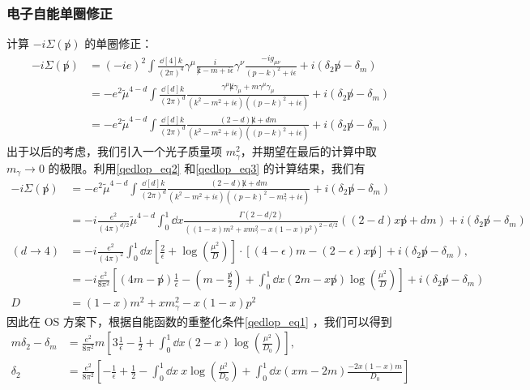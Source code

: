 \subsubsection{电子自能单圈修正}
计算 $-i\Sigma(\not p)$ 的单圈修正：
\begin{equation}
\begin{aligned}
-i\Sigma(\not p)
&=(-ie)^2 \int\frac{\dd[4]{k}}{(2\pi)^4} \gamma^\mu\frac{i}{\not k-m+i\epsilon} \gamma^\nu  \frac{-ig_{\mu\nu}}{(p-k)^2+i\epsilon}+i(\delta_2\not p -\delta_m)\\
&=-e^2\tilde{\mu}^{4-d} \int\frac{\dd[d]{k}}{(2\pi)^d} \frac{\gamma^\mu \not k \gamma_\mu + m\gamma^\mu\gamma_\mu}{(k^2-m^2+i\epsilon)((p-k)^2+i\epsilon)}+i(\delta_2\not p -\delta_m)
\\
&=-e^2\tilde{\mu}^{4-d} \int\frac{\dd[d]{k}}{(2\pi)^d} \frac{(2-d)\not k + dm}{(k^2-m^2+i\epsilon)((p-k)^2+i\epsilon)}+i(\delta_2\not p -\delta_m)
\end{aligned}
\end{equation}
出于以后的考虑，我们引入一个光子质量项 $m_\gamma^2$，并期望在最后的计算中取 $m_\gamma\rightarrow 0$ 的极限。利用\autoref{qedlop_eq2} 和\autoref{qedlop_eq3} 的计算结果，我们有
\begin{equation}
\begin{aligned}
-i\Sigma(\not p)
&=-e^2\tilde{\mu}^{4-d} \int\frac{\dd[d]{k}}{(2\pi)^d} \frac{(2-d)\not k + dm}{(k^2-m^2+i\epsilon)((p-k)^2-m_\gamma^2+i\epsilon)}+i(\delta_2\not p -\delta_m)
\\
&= -i\frac{e^2}{(4\pi)^{d/2}}\tilde{\mu}^{4-d}
\int_0^1 \dd x \frac{\Gamma(2-d/2)}{((1-x)m^2+x m_\gamma^2-x(1-x)p^2)^{2-d/2}}((2-d)x\not p+dm)
+i(\delta_2\not p -\delta_m)
\\
(d\rightarrow 4)&= -i\frac{e^2}{(4\pi)^2}  \int_0^1 \dd x \left[\frac{2}{\epsilon}+\log\left(\frac{\mu^2}{D}\right)\right]\cdot \left[(4-\epsilon)m -(2-\epsilon)x\not p\right]
+i(\delta_2\not p -\delta_m),\\
&=-i\frac{e^2}{8\pi^2}\left[(4m-\not p)\frac{1}{\epsilon}-\left(m-\frac{\not p}{2}\right)+ \int_0^1\dd x (2m-x\not p)\log\left(\frac{\mu^2}{D}\right) \right]
+i(\delta_2\not p -\delta_m)\\
D&=(1-x)m^2+xm_\gamma^2-x(1-x)p^2
\end{aligned}
\end{equation}
因此在 OS 方案下，根据自能函数的重整化条件\autoref{qedlop_eq1} ，我们可以得到
\begin{equation}
\begin{aligned}
m\delta_2 - \delta_m &= \frac{e^2}{8\pi^2}m\left[3\frac{1}{\epsilon}-\frac{1}{2}+ \int_0^1\dd{x} (2-x)\log\left(\frac{\mu^2}{D_0}\right) \right],\\
\delta_2 &= \frac{e^2}{8\pi^2}\left[-\frac{1}{\epsilon}+\frac{1}{2}-\int_0^1 \dd{x}\ x\log\left(\frac{\mu^2}{D_0} \right) 
+\int_0^1 \dd{x} (xm-2m)\frac{-2x(1-x)m}{D_0}
\right]
\end{aligned}
\end{equation}
